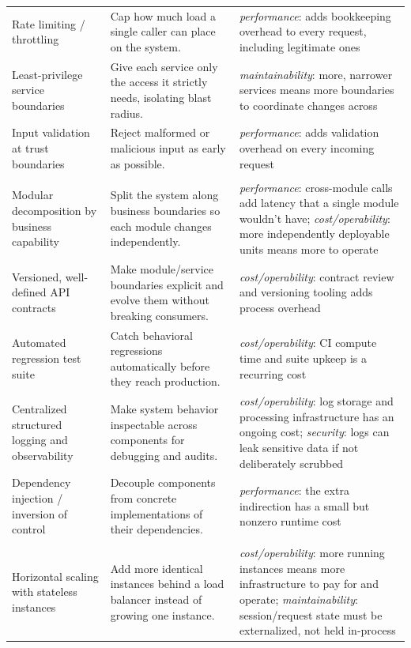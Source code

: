 \documentclass[preprint,12pt,authoryear]{elsarticle}
\renewcommand{\_}{\textunderscore\allowbreak{}}
\begin{document}
{\begin{longtable}{@{}>{\raggedright\arraybackslash}p{1.35in}>{\raggedright\arraybackslash}p{1.65in}>{\raggedright\arraybackslash}p{2.22in}@{}}
Rate limiting / throttling & Cap how much load a single caller can place on the system. & \emph{performance}: adds bookkeeping overhead to every request, including legitimate ones \\
Least-privilege service boundaries & Give each service only the access it strictly needs, isolating blast radius. & \emph{maintainability}: more, narrower services means more boundaries to coordinate changes across \\
Input validation at trust boundaries & Reject malformed or malicious input as early as possible. & \emph{performance}: adds validation overhead on every incoming request \\
\midrule
\multicolumn{3}{@{}l}{\textbf{Maintainability}} \\
\midrule
Modular decomposition by business capability & Split the system along business boundaries so each module changes independently. & \emph{performance}: cross-module calls add latency that a single module wouldn't have; \emph{cost/operability}: more independently deployable units means more to operate \\
Versioned, well-defined API contracts & Make module/service boundaries explicit and evolve them without breaking consumers. & \emph{cost/operability}: contract review and versioning tooling adds process overhead \\
Automated regression test suite & Catch behavioral regressions automatically before they reach production. & \emph{cost/operability}: CI compute time and suite upkeep is a recurring cost \\
Centralized structured logging and observability & Make system behavior inspectable across components for debugging and audits. & \emph{cost/operability}: log storage and processing infrastructure has an ongoing cost; \emph{security}: logs can leak sensitive data if not deliberately scrubbed \\
Dependency injection / inversion of control & Decouple components from concrete implementations of their dependencies. & \emph{performance}: the extra indirection has a small but nonzero runtime cost \\
\midrule
\multicolumn{3}{@{}l}{\textbf{Scalability}} \\
\midrule
Horizontal scaling with stateless instances & Add more identical instances behind a load balancer instead of growing one instance. & \emph{cost/operability}: more running instances means more infrastructure to pay for and operate; \emph{maintainability}: session/request state must be externalized, not held in-process \\

\end{longtable}}
\end{document}

